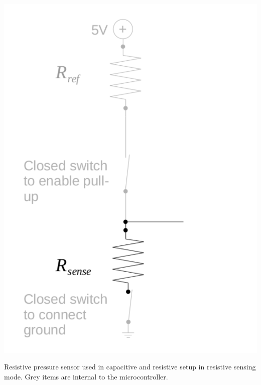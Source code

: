 \documentclass{sigchi-ext}
\begin{document}
\begin{marginfigure}
\begin{minipage}{\marginparwidth}
\centering
\includegraphics[width=0.9\columnwidth]{figures/cap_res_setup_res}
\caption{Resistive pressure sensor used in capacitive and resistive setup in
resistive sensing mode. Grey items are internal to the
microcontroller.}~\label{fig:cap_res_setup_res}
\end{minipage}
\end{marginfigure}
\end{document}
